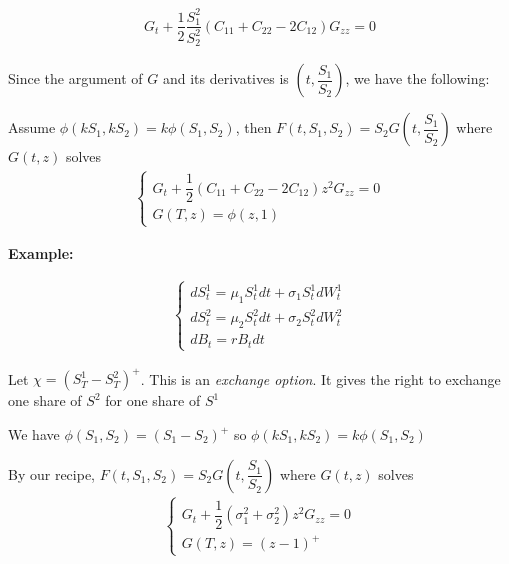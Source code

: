 \begin{equation*}
  \begin{gathered}
    G_t+\dfrac{1}{2}\dfrac{S_1^2}{S_2^2}\left(C_{11}+C_{22}-2C_{12}\right)G_{zz} = 0
  \end{gathered}
\end{equation*}
\par\bigskip
\noindent Since the argument of $G$ and its derivatives is $\left(t,\dfrac{S_1}{S_2}\right)$, we have the following:
\par\bigskip
\begin{lem}[]{}
  Assume $\phi(kS_1,kS_2) = k\phi(S_1,S_2)$, then $F(t,S_1,S_2) = S_2G\left(t,\dfrac{S_1}{S_2}\right)$ where $G(t,z)$ solves
  \begin{equation*}
    \begin{gathered}
      \begin{cases}
        G_t+\dfrac{1}{2}\left(C_{11}+C_{22}-2C_{12}\right)z^2G_{zz}=0\\
        G(T,z) = \phi(z,1)
      \end{cases}
    \end{gathered}
  \end{equation*}
\end{lem}
\par\bigskip
\noindent\textbf{Example:}\par
\begin{equation*}
  \begin{gathered}
    \begin{cases}
      dS_t^1 = \mu_1S_t^1dt+\sigma_1S_t^1dW_t^1\\
      dS_t^2=\mu_2S_t^2dt+\sigma_2S_t^2dW_t^2\\
      dB_t = rB_tdt
    \end{cases}
  \end{gathered}
\end{equation*}\par
\noindent Let $\chi = \left(S_T^1-S_T^2\right)^+$. This is an \textit{exchange option}. It gives the right to exchange one share of $S^2$ for one share of $S^1$\par
\noindent We have $\phi(S_1,S_2) = (S_1-S_2)^+$ so $\phi(kS_1,kS_2) = k\phi(S_1,S_2)$\par
\noindent By our recipe, $F(t,S_1,S_2) = S_2G\left(t,\dfrac{S_1}{S_2}\right)$ where $G(t,z)$ solves
\begin{equation*}
  \begin{gathered}
    \begin{cases}
      G_t+\dfrac{1}{2}\left(\sigma_1^2+\sigma_2^2\right)z^2G_{zz}=0\\
      G(T,z) = (z-1)^+
    \end{cases}
  \end{gathered}
\end{equation*}\par
